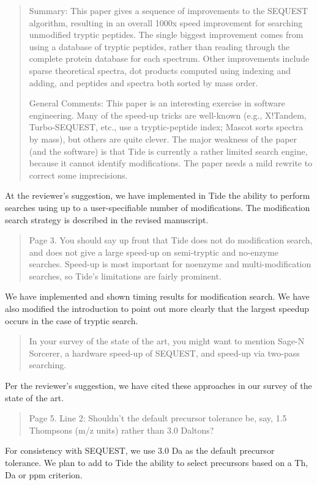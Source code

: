 \documentclass{article}
\newcommand{\breview}{\begin{quotation}\begin{em}\noindent}
\newcommand{\ereview}{\end{em}\end{quotation}}
\begin{document}
\breview Summary: This paper gives a sequence of improvements to the
SEQUEST algorithm, resulting in an overall 1000x speed improvement for
searching unmodified tryptic peptides. The single biggest improvement
comes from using a database of tryptic peptides, rather than reading
through the complete protein database for each spectrum. Other
improvements include sparse theoretical spectra, dot products computed
using indexing and adding, and peptides and spectra both sorted by
mass order.

General Comments: This paper is an interesting exercise in
software engineering. Many of the speed-up tricks are well-known
(e.g., X!Tandem, Turbo-SEQUEST, etc., use a tryptic-peptide index;
Mascot sorts spectra by mass), but others are quite clever. The major
weakness of the paper (and the software) is that Tide is currently a
rather limited search engine, because it cannot identify
modifications. The paper needs a mild rewrite to correct some
imprecisions.  \ereview

At the reviewer's suggestion, we have implemented in Tide the ability
to perform searches using up to a user-specifiable number of
modifications. The modification search strategy is described in the
revised manuscript.

\breview Page 3. You should say up front that Tide does not do
modification search, and does not give a large speed-up on
semi-tryptic and no-enzyme searches. Speed-up is most important for
noenzyme and multi-modification searches, so Tide's limitations are
fairly prominent. \ereview

We have implemented and shown timing results for modification
search. We have also modified the introduction to point out more
clearly that the largest speedup occurs in the case of tryptic search.

\breview In your survey of the state of the art, you might
want to mention Sage-N Sorcerer, a hardware speed-up of SEQUEST, and
speed-up via two-pass searching.  \ereview

Per the reviewer's suggestion, we have cited these approaches in our
survey of the state of the art.

\breview Page 5. Line 2: Shouldn't the default precursor tolerance be,
say, 1.5 Thompsons (m/z units) rather than 3.0 Daltons? \ereview

For consistency with SEQUEST, we use 3.0 Da as the default precursor
tolerance.  We plan to add to Tide the ability to select precursors
based on a Th, Da or ppm criterion.
\end{document}
